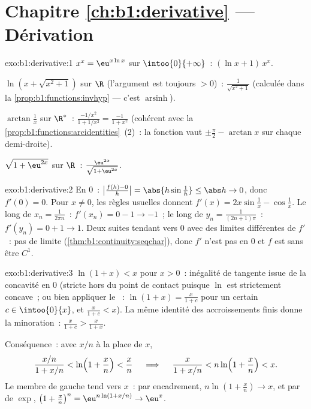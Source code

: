 \section*{Chapitre \ref{ch:b1:derivative} --- Dérivation}

\begin{solution}{exo:b1:derivative:1}
$x^x = \eu^{x\ln x}$ sur $\intoo{0}{+\infty}$~:  $(\ln x +
1)\,x^x$.

$\ln(x + \sqrt{x^2+1})$ sur $\R$ (l'argument est toujours $> 0$)~:
 $\frac{1}{\sqrt{x^2+1}}$ (calculée dans la
\cref{prop:b1:functions:invhyp} --- c'est
$\operatorname{arsinh}$).

$\arctan\frac1x$ sur $\R^*$~:  $\frac{-1/x^2}{1 + 1/x^2} =
\frac{-1}{1 + x^2}$ (cohérent avec la
\cref{prop:b1:functions:arcidentities}~(2)~: la fonction vaut
$\pm\frac\pi2 - \arctan x$ sur chaque demi-droite).

$\sqrt{1 + \eu^{2x}}$ sur $\R$~: 
$\frac{\eu^{2x}}{\sqrt{1 + \eu^{2x}}}$.
\end{solution}

\begin{solution}{exo:b1:derivative:2}
En $0$~: $\bigl|\frac{f(h) - 0}{h}\bigr| = \abs{h \sin\frac1h} \leq
\abs h \to 0$, donc $f'(0) = 0$. Pour $x \neq 0$, les règles usuelles donnent
$f'(x) = 2x\sin\frac1x - \cos\frac1x$. Le long de $x_n = \frac{1}{2\pi
n}$~: $f'(x_n) = 0 - 1 \to -1$~; le long de $y_n = \frac{1}{(2n+1)\pi}$~:
$f'(y_n) = 0 + 1 \to 1$. Deux suites tendant vers $0$ avec des limites
différentes de $f'$~: pas de limite (\cref{thm:b1:continuity:seqchar}), donc $f'$
n'est pas  en $0$ et $f$ est  sans être
$C^1$.
\end{solution}

\begin{solution}{exo:b1:derivative:3}
$\ln(1+x) < x$ pour $x > 0$~: inégalité de tangente issue de la concavité en $0$
(stricte hors du point de contact puisque $\ln$ est strictement concave~;
ou bien appliquer le ~: $\ln(1+x) = \frac{x}{1+c}$ pour un certain
$c \in \intoo{0}{x}$, et $\frac{x}{1+c} < x$). La même identité des
accroissements finis donne la minoration~: $\frac{x}{1+c} > \frac{x}{1+x}$.

Conséquence~: avec $x/n$ à la place de $x$,
\[
\frac{x/n}{1 + x/n} < \ln\Bigl(1 + \frac xn\Bigr) < \frac xn
\quad\implies\quad
\frac{x}{1 + x/n} < n \ln\Bigl(1 + \frac xn\Bigr) < x .
\]
Le membre de gauche tend vers $x$~: par encadrement, $n\ln(1 + \frac xn)
\to x$, et par  de $\exp$, $\bigl(1 + \frac xn\bigr)^n =
\eu^{n\ln(1 + x/n)} \to \eu^x$.
\end{solution}

